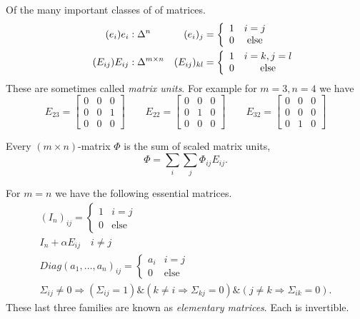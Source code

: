 \documentclass[12pt,twoside,dvipsnames,letterpaper]{memoir}
\begin{document}
Of the many important classes of of matrices.
\begin{align}
    \tag{$e_i$}
    e_i&:\Delta^n  & (e_i)_j  & = \left\{\begin{array}{cc}
        1 & i=j\\ 0 & \text{else}
    \end{array}\right.\\
    \tag{$E_{ij}$}
    E_{ij}& :\Delta^{m\times n}  
    &
    (E_{ij})_{kl} &= \left\{\begin{array}{cc}
        1 & i=k, j=l\\
        0 & \text{else}
    \end{array}\right.
\end{align}
These are sometimes called \emph{matrix units}.
For example for $m=3,n=4$ we have
\[
    E_{23}=\begin{bmatrix} 0 & 0 & 0 \\ 0 & 0 & 1 \\ 0 & 0 & 0 \end{bmatrix}
    \qquad
    E_{22}=\begin{bmatrix} 0 & 0 & 0 \\ 0 & 1 & 0 \\ 0 & 0 & 0 \end{bmatrix}
    \qquad 
    E_{32}
    =\begin{bmatrix} 0 & 0 & 0 \\ 0 & 0 & 0 \\ 0 & 1 & 0 \end{bmatrix}
\]
\begin{proposition}
    Every $(m\times n)$-matrix $\Phi$ is the sum of scaled matrix units,
    \[
        \Phi = \sum_{i}\sum_j \Phi_{ij}E_{ij}.
    \]
\end{proposition}

For $m=n$ we have the following essential matrices.
\begin{gather}
    \tag{$I_n$}
    (I_n)_{ij} = \left\{\begin{array}{cc}
        1 & i=j\\
        0 & \text{else}
    \end{array}\right.\\
    \tag{Transvection}
    I_n+\alpha E_{ij}  \quad i\neq j\\
    \tag{Diagonal}
    Diag(a_1,\ldots,a_n)_{ij} = \left\{\begin{array}{cc}
        a_i & i=j\\
        0 & \text{else}
    \end{array}\right.\\
    \tag{Permutation}
    \Sigma_{ij}\neq 0  \Rightarrow (\Sigma_{ij}=1) \& (k\neq i\Rightarrow \Sigma_{kj}=0)
    \& (j\neq k\Rightarrow \Sigma_{ik}=0).
\end{gather}
These last three families are known as \emph{elementary matrices}.
Each is invertible. 
\end{document}
